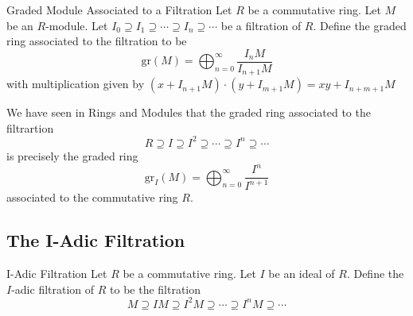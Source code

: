 \documentclass[a4paper]{article}
\begin{document}
\begin{defn}{Graded Module Associated to a Filtration}{} Let $R$ be a commutative ring. Let $M$ be an $R$-module. Let $I_0\supseteq I_1\supseteq\cdots\supseteq I_n\supseteq\cdots$ be a filtration of $R$. Define the graded ring associated to the filtration to be $$\text{gr}(M)=\bigoplus_{n=0}^\infty\frac{I_nM}{I_{n+1}M}$$ with multiplication given by $(x+I_{n+1}M)\cdot(y+I_{m+1}M)=xy+I_{n+m+1}M$
\end{defn}

We have seen in Rings and Modules that the graded ring associated to the filtrartion $$R\supseteq I\supseteq I^2\supseteq\cdots\supseteq I^n\supseteq\cdots$$ is precisely the graded ring $$\text{gr}_I(M)=\bigoplus_{n=0}^\infty\frac{I^n}{I^{n+1}}$$ associated to the commutative ring $R$. 

\subsection{The I-Adic Filtration}
\begin{defn}{I-Adic Filtration}{} Let $R$ be a commutative ring. Let $I$ be an ideal of $R$. Define the $I$-adic filtration of $R$ to be the filtration $$M\supseteq IM\supseteq I^2M\supseteq\cdots\supseteq I^nM\supseteq\cdots$$
\end{defn}
\end{document}
